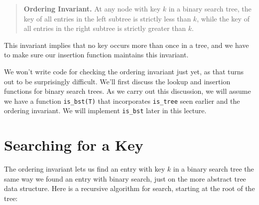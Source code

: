 \begin{quote}
  \noindent\textbf{Ordering Invariant.} At any node with key $k$ in a
  binary search tree, the key of all entries in the left subtree is
  strictly less than $k$, while the key of all entries in the right
  subtree is strictly greater than $k$.
\end{quote}
This invariant implies that no key occurs more than once in a tree,
and we have to make sure our insertion function maintains this
invariant.

We won't write code for checking the ordering invariant just yet, as
that turns out to be surprisingly difficult. We'll first discuss the
lookup and insertion functions for binary search trees.  As we carry
out this discussion, we will assume we have a function
\lstinline'is_bst(T)' that incorporates \lstinline'is_tree' seen
earlier and the ordering invariant.  We will implement
\lstinline'is_bst' later in this lecture.


\section{Searching for a Key}
\label{sec:bst:searching}

The ordering invariant lets us find an entry with key $k$ in a
binary search tree the same way we found an entry with binary
search, just on the more abstract tree data structure.  Here is a
recursive algorithm for search, starting at the root of the tree:

